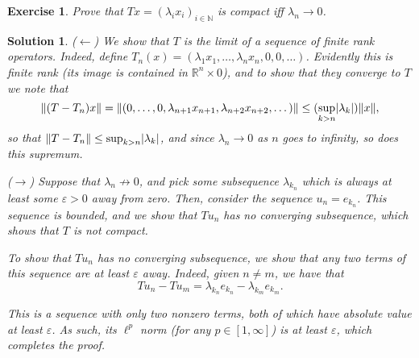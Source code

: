 \documentclass{article}
\newtheorem{ex}{Exercise}
\theoremstyle{nonumberplain}
\newtheorem{sol}{Solution}
\newcommand{\R}{\mathbb{R}}
\newcommand{\N}{\mathbb{N}}
\DeclarePairedDelimiter{\abs}{\lvert}{\rvert}
\DeclarePairedDelimiter{\Norm}{\lVert}{\rVert}
\begin{document}
\begin{ex}
Prove that $Tx = (\lambda_i x_i)_{i \in \N}$ is compact iff $\lambda_n \to 0$.
\end{ex}

\begin{sol}
($\leftarrow$) We show that $T$ is the limit of a sequence of finite rank operators. Indeed, define $T_n(x) = (\lambda_1 x_1, \dots, \lambda_n x_n, 0, 0, \dots)$. Evidently this is finite rank (its image is contained in $\R^n \times 0$), and to show that they converge to $T$ we note that
\begin{equation}
\Norm{(T - T_n) x} = \Norm{(0,\dots,0,\lambda_{n+1} x_{n+1}, \lambda_{n+2} x_{n+2},\dots)} \leq (\sup_{k > n} \abs{\lambda_k}) \Norm{x},
\end{equation}
so that $\Norm{T-T_n} \leq \sup_{k > n} \abs{\lambda_k}$, and since $\lambda_n \to 0$ as $n$ goes to infinity, so does this supremum.

($\rightarrow$) Suppose that $\lambda_n \not \to 0$, and pick some subsequence $\lambda_{k_n}$ which is always at least some $\varepsilon > 0$ away from zero. Then, consider the sequence $u_n = e_{k_n}$. This sequence is bounded, and we show that $T u_n$ has no converging subsequence, which shows that $T$ is not compact.

To show that $T u_n$ has no converging subsequence, we show that any two terms of this sequence are at least $\varepsilon$ away. Indeed, given $n \neq m$, we have that
\begin{equation}
T u_n - T u_m = \lambda_{k_n} e_{k_n} - \lambda_{k_m} e_{k_m}.
\end{equation}

This is a sequence with only two nonzero terms, both of which have absolute value at least $\varepsilon$. As such, its $\ell^p$ norm (for any $p \in [1,\infty]$) is at least $\varepsilon$, which completes the proof.
\end{sol}
\end{document}
